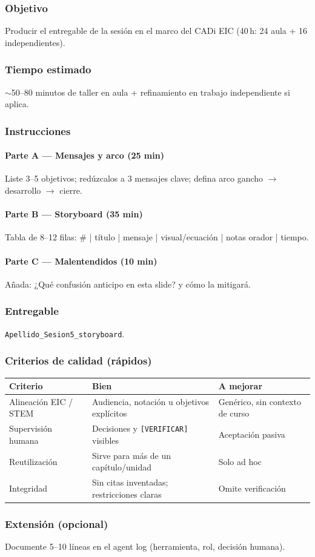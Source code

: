 \subsubsection*{Objetivo}
Producir el entregable de la sesión en el marco del CADi EIC (40\,h: 24 aula + 16 independientes).

\subsubsection*{Tiempo estimado}
$\sim$50--80 minutos de taller en aula + refinamiento en trabajo independiente si aplica.

\subsubsection*{Instrucciones}
\paragraph{Parte A --- Mensajes y arco (25 min)} Liste 3--5 objetivos; redúzcalos a 3 mensajes clave; defina arco gancho $\rightarrow$ desarrollo $\rightarrow$ cierre.
\paragraph{Parte B --- Storyboard (35 min)} Tabla de 8--12 filas: \# | título | mensaje | visual/ecuación | notas orador | tiempo.
\paragraph{Parte C --- Malentendidos (10 min)} Añada: ¿Qué confusión anticipo en esta slide? y cómo la mitigará.

\subsubsection*{Entregable}
\texttt{Apellido\_Sesion5\_storyboard}.

\subsubsection*{Criterios de calidad (rápidos)}
\begin{tabularx}{\textwidth}{@{}lXX@{}}
\toprule
Criterio & Bien & A mejorar \\
\midrule
Alineación EIC / STEM & Audiencia, notación u objetivos explícitos & Genérico, sin contexto de curso \\
Supervisión humana & Decisiones y \texttt{[VERIFICAR]} visibles & Aceptación pasiva \\
Reutilización & Sirve para más de un capítulo/unidad & Solo ad hoc \\
Integridad & Sin citas inventadas; restricciones claras & Omite verificación \\
\bottomrule
\end{tabularx}

\subsubsection*{Extensión (opcional)}
Documente 5--10 líneas en el agent log (herramienta, rol, decisión humana).
